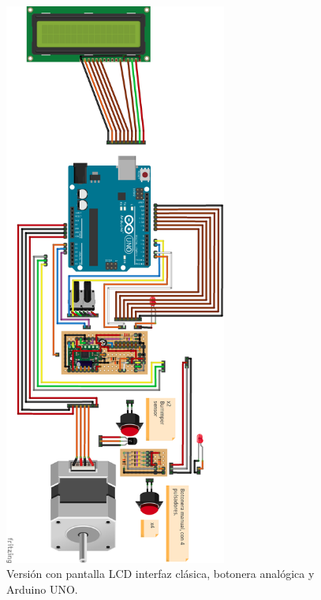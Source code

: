 \begin{figure}[h]
	\centering
	\includegraphics[width=0.65\textwidth]{../images/circuito2}
	\caption[Versión 1 del dispositivo]{Versión con pantalla LCD interfaz clásica, botonera analógica y Arduino UNO.}
	\label{circuito2}
\end{figure}


